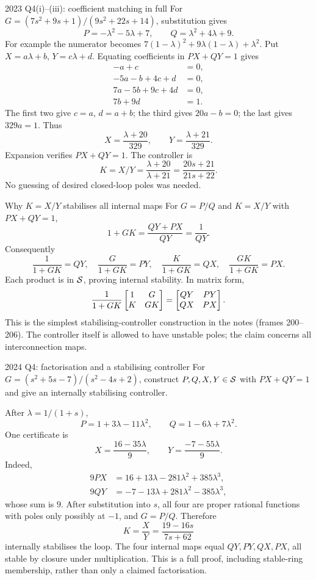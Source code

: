\begin{worked}{2023 Q4(i)--(iii): coefficient matching in full}
For $G=(7s^2+9s+1)/(9s^2+22s+14)$, substitution gives
\[P=-\lambda^2-5\lambda+7,\qquad Q=\lambda^2+4\lambda+9.\]
For example the numerator becomes $7(1-\lambda)^2+9\lambda(1-\lambda)+\lambda^2$. Put $X=a\lambda+b$, $Y=c\lambda+d$. Equating coefficients in $PX+QY=1$ gives
\begin{align*}
-a+c&=0,\\-5a-b+4c+d&=0,\\7a-5b+9c+4d&=0,\\7b+9d&=1.
\end{align*}
The first two give $c=a$, $d=a+b$; the third gives $20a-b=0$; the last gives $329a=1$. Thus
\[X=\frac{\lambda+20}{329},\qquad Y=\frac{\lambda+21}{329}.\]
Expansion verifies $PX+QY=1$. The controller is
\[K=X/Y=\frac{\lambda+20}{\lambda+21}=\frac{20s+21}{21s+22}.\]
No guessing of desired closed-loop poles was needed.
\end{worked}
\begin{concept}{Why $K=X/Y$ stabilises all internal maps}
For $G=P/Q$ and $K=X/Y$ with $PX+QY=1$,
\[1+GK=\frac{QY+PX}{QY}=\frac1{QY}.\]
Consequently
\[\frac1{1+GK}=QY,\quad\frac G{1+GK}=PY,\quad\frac K{1+GK}=QX,\quad\frac{GK}{1+GK}=PX.\]
Each product is in $\mathcal S$, proving internal stability. In matrix form,
\[\frac1{1+GK}\begin{bmatrix}1&G\\K&GK\end{bmatrix}=\begin{bmatrix}QY&PY\\QX&PX\end{bmatrix}.\]
This is the simplest stabilising-controller construction in the notes (frames 200--206). The controller itself is allowed to have unstable poles; the claim concerns all interconnection maps.
\end{concept}
\begin{question}{2024 Q4: factorisation and a stabilising controller}
For $G=(s^2+5s-7)/(s^2-4s+2)$, construct $P,Q,X,Y\in\mathcal S$ with $PX+QY=1$ and give an internally stabilising controller.
\end{question}
\begin{answer}
After $\lambda=1/(1+s)$,
\[P=1+3\lambda-11\lambda^2,\qquad Q=1-6\lambda+7\lambda^2.\]
One certificate is
\[X=\frac{16-35\lambda}{9},\qquad Y=\frac{-7-55\lambda}{9}.\]
Indeed,
\begin{align*}
9PX&=16+13\lambda-281\lambda^2+385\lambda^3,\\
9QY&=-7-13\lambda+281\lambda^2-385\lambda^3,
\end{align*}
whose sum is $9$. After substitution into $s$, all four are proper rational functions with poles only possibly at $-1$, and $G=P/Q$. Therefore
\[K=\frac XY=\frac{19-16s}{7s+62}\]
internally stabilises the loop. The four internal maps equal $QY,PY,QX,PX$, all stable by closure under multiplication. This is a full proof, including stable-ring membership, rather than only a claimed factorisation.
\end{answer}
